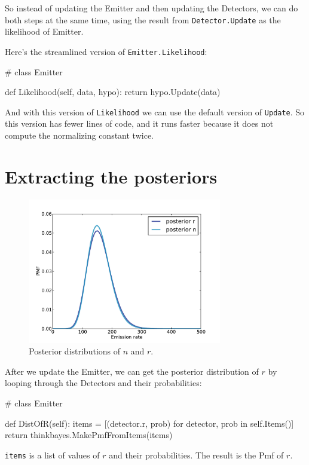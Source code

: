 \documentclass[12pt]{book}
\theoremstyle{exercise}
\begin{document}
So instead of updating the Emitter and then updating the
Detectors, we can do both steps at the same time, using
the result from {\tt Detector.Update} as the likelihood
of Emitter.

Here's the streamlined version of {\tt Emitter.Likelihood}:

\begin{code}
# class Emitter

    def Likelihood(self, data, hypo):
        return hypo.Update(data)
\end{code}

And with this version of {\tt Likelihood} we can use the
default version of {\tt Update}.  So this version has fewer
lines of code, and it runs faster because it does not compute
the normalizing constant twice.


\section{Extracting the posteriors}

\begin{figure}
\centerline{\includegraphics[height=2.5in]{figs/jaynes2.pdf}}
\caption{Posterior distributions of $n$ and $r$.}
\label{fig.jaynes2}
\end{figure}

After we update the Emitter, we can get the posterior distribution
of $r$ by looping through the Detectors and their probabilities:

\begin{code}
# class Emitter

    def DistOfR(self):
        items = [(detector.r, prob) for detector, prob in self.Items()]
        return thinkbayes.MakePmfFromItems(items)
\end{code}

{\tt items} is a list of values of $r$ and their probabilities.
The result is the Pmf of $r$.
\end{document}

